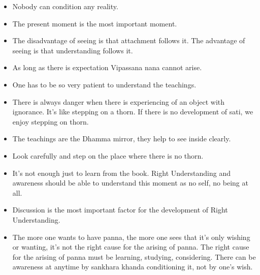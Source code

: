 \documentclass{article}
\begin{document}
\begin{itemize}
\item 
  Nobody can condition any reality.

\item 
  The present moment is the most important moment.

\item 
  The disadvantage of seeing is that attachment follows it. The
  advantage of seeing is that understanding follows it.

\item 
  As long as there is expectation Vipassana nana cannot arise.

\item 
  One has to be so very patient to understand the teachings.

\item 
  There is always danger when there is experiencing of an object with
  ignorance. It's like stepping on a thorn. If there is no
  development of sati, we enjoy stepping on thorn.

\item 
  The teachings are the Dhamma mirror, they help to see inside
  clearly.

\item 
  Look carefully and step on the place where there is no thorn.

\item 
  It's not enough just to learn from the book. Right Understanding
  and awareness should be able to understand this moment as no self,
  no being at all.

\item 
  Discussion is the most important factor for the development of
  Right Understanding.

\item 
  The more one wants to have panna, the more one sees that it's only
  wishing or wanting, it's not the right cause for the arising of
  panna. The right cause for the arising of panna must be learning,
  studying, considering. There can be awareness at anytime by
  sankhara khanda conditioning it, not by one's wish.

\end{itemize}
\end{document}
